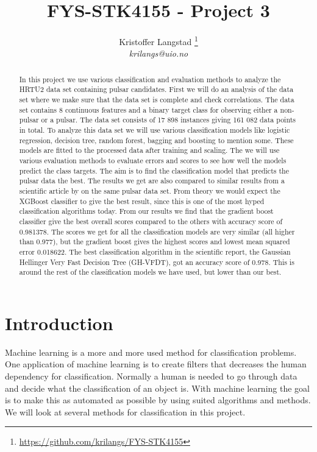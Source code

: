 \documentclass[12pt,a4paper,english]{article}
\title{FYS-STK4155 - Project 3}
\date{}
\author{ Kristoffer Langstad \footnote{\url{https://github.com/krilangs/FYS-STK4155}}\\ \textit{krilangs@uio.no}}
\begin{document}
\maketitle
\begin{abstract}
In this project we use various classification and evaluation methods to analyze the HRTU2 data set containing pulsar candidates. First we will do an analysis of the data set where we make sure that the data set is complete and check correlations. The data set contains 8 continuous features and a binary target class for observing either a non-pulsar or a pulsar. The data set consists of 17 898 instances giving 161 082 data points in total. To analyze this data set we will use various classification models like logistic regression, decision tree, random forest, bagging and boosting to mention some. These models are fitted to the processed data after training and scaling. The we will use various evaluation methods to evaluate errors and scores to see how well the models predict the class targets. The aim is to find the classification model that predicts the pulsar data the best. The results we get are also compared to similar results from a scientific article by \citet{pulsar_art} on the same pulsar data set. From theory we would expect the XGBoost classifier to give the best result, since this is one of the most hyped classification algorithms today. From our results we find that the gradient boost classifier give the best overall scores compared to the others with accuracy score of 0.981378. The scores we get for all the classification models are very similar (all higher than 0.977), but the gradient boost gives the highest scores and lowest mean squared error 0.018622. The best classification algorithm in the scientific report, the Gaussian Hellinger Very Fast Decision Tree (GH-VFDT), got an accuracy score of 0.978. This is around the rest of the classification models we have used, but lower than our best.
\end{abstract}

\section{Introduction}
\label{sect:Introduction}
Machine learning is a more and more used method for classification problems. One application of machine learning is to create filters that decreases the human dependency for classification. Normally a human is needed to go through data and decide what the classification of an object is. With machine learning the goal is to make this as automated as possible by using suited algorithms and methods. We will look at several methods for classification in this project.
\end{document}
